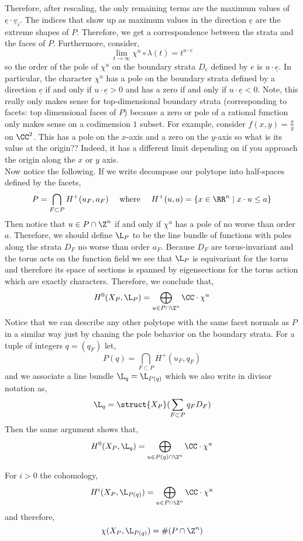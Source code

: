 \documentclass[12pt]{article}
\begin{document}
Therefore, after rescaling, the only remaining terms are the maximum values of $\underline{e} \cdot \underline{v}_i$. The indices that show up as maximum values in the direction $\underline{e}$ are the extreme shapes of $P$. Therefore, we get a correspondence between the strata and the faces of $P$. Furthermore, consider,
\[ \lim_{t \to \infty} \chi^u \circ \lambda(t) = t^{u \cdot \underline{e}} \]
so the order of the pole of $\chi^u$ on the boundary strata $D_e$ defined by $e$ is $u \cdot \underline{e}$. In particular, the character $\chi^u$ has a pole on the boundary strata defined by a direction $\underline{e}$ if and only if $u \cdot \underline{e} > 0$ and has a zero if and only if $u \cdot \underline{e} < 0$. Note, this really only makes sense for top-dimensional boundary strata (corresponding to facets: top dimensional faces of $P$) because a zero or pole of a rational function only makes sense on a codimension $1$ subset. For example, consider $f(x,y) = \frac{x}{y}$ on $\CC^2$. This has a pole on the $x$-axis and a zero on the $y$-axis so what is its value at the origin?? Indeed, it has a different limit depending on if you approach the origin along the $x$ or $y$ axis. 
\bigskip\\
Now notice the following. If we write decompose our polytope into half-spaces defined by the facets,
\[ P = \bigcap_{F \subset P} H^+(u_F, a_F) \quad \text{ where } \quad H^+(u, a) = \{ x \in \RR^n \mid x \cdot u \le a \} \]
Then notice that $u \in P \cap \Z^n$ if and only if $\chi^u$ has a pole of no worse than order $a$. Therefore, we should define $\L_P$ to be the line bundle of functions with poles along the strata $D_F$ no worse than order $a_F$. Because $D_F$ are torus-invariant and the torus acts on the function field we see that $\L_P$ is equivariant for the torus and therefore its space of sections is spanned by eigensections for the torus action which are exactly characters. Therefore, we conclude that,
\[ H^0(X_P, \L_P) = \bigoplus_{u \in P \cap \Z^n} \CC \cdot \chi^u \]
Notice that we can describe any other polytope with the same facet normals as $P$ in a similar way just by chaning the pole behavior on the boundary strata. For a tuple of integers $q = (q_F)$ let,
\[ P(q) = \bigcap_{F \subset P} H^+(u_F, q_F) \]
and we associate a line bundle $\L_q = \L_{P(q)}$ which we also write in divisor notation as,
\[ \L_q = \struct{X_P}(\sum_{F \subset P} q_F D_F) \]
Then the same argument shows that,
\[ H^0(X_P, \L_q) = \bigoplus_{u \in P(q) \cap \Z^n} \CC \cdot \chi^u \]

\begin{thm}[Demazure]
For $i > 0$ the cohomology,
\[ H^i(X_P, \L_{P(q)}) = \bigoplus_{u \in P \cap \Z^n} \CC \cdot \chi^u \]
and therefore,
\[ \chi(X_P, \L_{P(q)}) = \# (P \cap \Z^n) \]
\end{thm}
\end{document}
